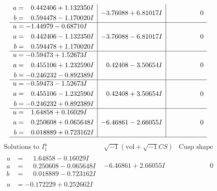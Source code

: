 \documentclass[1p]{elsarticle_modified}
\theoremstyle{definition}
\newcommand{\I}{\sqrt{-1}}
\begin{document}
$$\begin{array}{c|c|c}
\begin{aligned}
a &= \phantom{-}0.442406 + 1.132350 I \\
b &= \phantom{-}0.594478 - 1.170020 I\end{aligned}
 & -3.76088 + 6.81017 I & \phantom{-0.000000 } 0 \\ \hline\begin{aligned}
u &= -1.44979 - 0.68710 I \\
a &= \phantom{-}0.442406 - 1.132350 I \\
b &= \phantom{-}0.594478 + 1.170020 I\end{aligned}
 & -3.76088 - 6.81017 I & \phantom{-0.000000 } 0 \\ \hline\begin{aligned}
u &= -0.59473 + 1.52673 I \\
a &= \phantom{-}0.455106 + 1.232590 I \\
b &= -0.246232 - 0.892389 I\end{aligned}
 & \phantom{-}0.42408 - 3.50654 I & \phantom{-0.000000 } 0 \\ \hline\begin{aligned}
u &= -0.59473 - 1.52673 I \\
a &= \phantom{-}0.455106 - 1.232590 I \\
b &= -0.246232 + 0.892389 I\end{aligned}
 & \phantom{-}0.42408 + 3.50654 I & \phantom{-0.000000 } 0 \\ \hline\begin{aligned}
u &= \phantom{-}1.64858 + 0.16029 I \\
a &= \phantom{-}0.250608 + 0.065648 I \\
b &= \phantom{-}0.018889 + 0.723162 I\end{aligned}
 & -6.46861 - 2.66055 I & \phantom{-0.000000 } 0\\
 \hline 
 \end{array}$$\newpage$$\begin{array}{c|c|c}  
\text{Solutions to }I^u_{1}& \I (\text{vol} + \sqrt{-1}CS) & \text{Cusp shape}\\
 \hline 
\begin{aligned}
u &= \phantom{-}1.64858 - 0.16029 I \\
a &= \phantom{-}0.250608 - 0.065648 I \\
b &= \phantom{-}0.018889 - 0.723162 I\end{aligned}
 & -6.46861 + 2.66055 I & \phantom{-0.000000 } 0 \\ \hline\begin{aligned}
u &= -0.172229 + 0.252662 I \\

\end{aligned}
\end{array}$$
\end{document}
